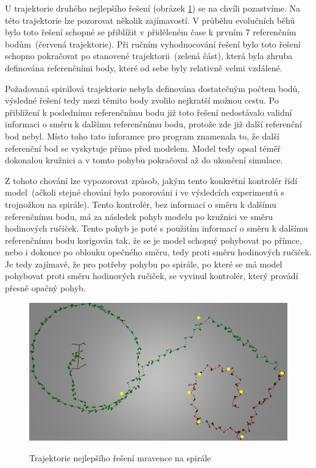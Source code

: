 U trajektorie druhého nejlepšího řešení (obrázek \ref{fig:mravenec_spirala_zhora_nejlepsi_reseni_trajektorie}) se na chvíli pozastvíme.
Na této trajektorie lze pozorovat několik zajímavostí.
V průběhu evolučních běhů bylo toto řešení schopné se přiblížit v přiděleném čase k prvním 7 referenčním bodům~(červená trajektorie).
Při ručním vyhodnocování řešení bylo toto řešení schopno pokračovat po stanovené trajektorii~(zelená část), která byla zhruba definována referenčními body, které od sebe byly relativně velmi vzdálené.

Požadovaná spirálová trajektorie nebyla definována dostatečným počtem bodů, výsledné řešení tedy mezi těmito body zvolilo nejkratší možnou cestu.
Po přiblížení k poslednímu referenčnímu bodu již toto řešení nedostávalo validní informaci o směru k dalšímu referenčnímu bodu, protože zde již další referenční bod nebyl.
Místo toho tato inforamce pro program znamenala to, že další referenční bod se vyskytuje přímo před modelem.
Model tedy opsal téměř dokonalou kružnici a v tomto pohybu pokračoval až do ukončení simulace.

Z tohoto chování lze vypozorovat způsob, jakým tento konkrétní kontrolér řídí model~(ačkoli stejné chování bylo pozorováni i ve výsledcích experimentů s trojnožkou na spirále).
Tento kontrolér, bez informací o směru k dalšímu referenčnímu bodu, má za následek pohyb modelu po kružnici ve směru hodinových ručiček.
Tento pohyb je poté s použitím informací o směru k dalšímu referenčnímu bodu korigován tak, že se je model schopný pohybovat po přímce, nebo i dokonce po oblouku opečného směru, tedy proti směru hodinových ručiček.
Je tedy zajímavé, že pro potřeby pohybu po spirále, po které se má model pohybovat proti směru hodinových ručiček, se vyvinul kontrolér, který provádí přesně opačný pohyb.


\begin{figure}[h]
    \centering
    {\includegraphics[width=\linewidth]{obrazky/mravenec_spirala_zhora_nejlepsi_reseni_trajektorie.png}}
    \caption{
    Trajektorie nejlepšího řešení mravence na spirále
    }
    \label{fig:mravenec_spirala_zhora_nejlepsi_reseni_trajektorie}
\end{figure}

